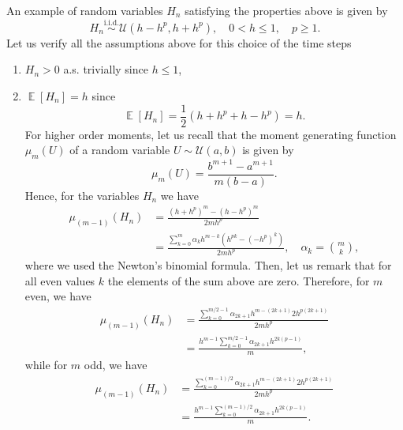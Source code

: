 \documentclass{siamart1116}
\numberwithin{theorem}{section}
\newcommand{\iid}{\ensuremath{\stackrel{\text{i.i.d.}}{\sim}}}
\newcommand{\E}{\operatorname{\mathbb{E}}}
\begin{document}
\begin{example}\label{ex:uniformH} An example of random variables $H_n$ satisfying the properties above is given by
	\begin{equation}
		H_n \iid \mathcal{U}(h-h^p, h+h^p), \quad 0 < h \leq 1, \quad p \geq 1.
	\end{equation}
	Let us verify all the assumptions above for this choice of the time steps
	\begin{enumerate}
		\item $H_n > 0$ a.s. trivially since $h \leq 1$,
		\item $\E[H_n] = h$ since 
		\begin{equation}
			\E[H_n] = \frac{1}{2}(h + h^p + h - h^p) = h.
		\end{equation}
		For higher order moments, let us recall that the moment generating function $\mu_{m}(U)$ of a random variable $U \sim \mathcal{U}(a,b)$ is given by
		\begin{equation}
			\mu_m(U) =  \frac{b^{m+1} - a^{m+1}}{m(b-a)}.
		\end{equation}
		Hence, for the variables $H_n$ we have
		\begin{equation}
		\begin{aligned}
			\mu_{(m-1)}(H_n) &= \frac{(h + h^p)^{m} - (h - h^p)^{m}}{2mh^p}\\
			&= \frac{\sum_{k=0}^m \alpha_k h^{m-k}(h^{pk} - (-h^p)^k)}{2mh^p}, \quad \alpha_k = \binom{m}{k},
		\end{aligned}
		\end{equation}
		where we used the Newton's binomial formula. Then, let us remark that for all even values $k$ the elements of the sum above are zero. Therefore, for $m$ even, we have
		\begin{equation}
		\begin{aligned}
			\mu_{(m-1)}(H_n) &= \frac{\sum_{k=0}^{m/2 - 1} \alpha_{2k + 1} h^{m-(2k+1)}2h^{p(2k+1)}}{2mh^p}\\
			&= \frac{h^{m-1}\sum_{k=0}^{m/2 - 1} \alpha_{2k + 1} h^{2k(p-1)}}{m},
		\end{aligned}
		\end{equation}
		while for $m$ odd, we have
		\begin{equation}
		\begin{aligned}
			\mu_{(m-1)}(H_n) &= \frac{\sum_{k=0}^{(m-1)/2} \alpha_{2k + 1} h^{m-(2k+1)}2h^{p(2k+1)}}{2mh^p}\\
			&= \frac{h^{m-1}\sum_{k=0}^{(m-1)/2} \alpha_{2k + 1} h^{2k(p-1)}}{m}.
		\end{aligned}

\end{equation}
\end{enumerate}
\end{example}
\end{document}
